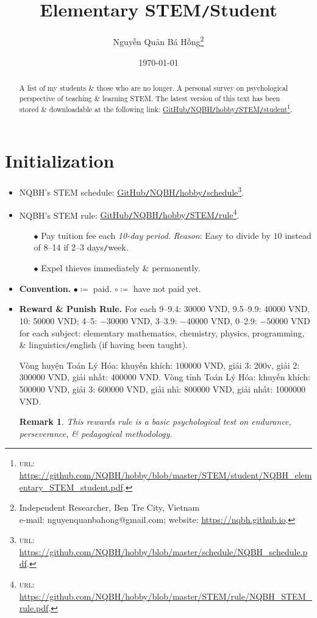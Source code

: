 \documentclass{article}
\title{Elementary STEM\texttt{/}Student}
\author{Nguyễn Quản Bá Hồng\footnote{Independent Researcher, Ben Tre City, Vietnam\\e-mail: \textsf{nguyenquanbahong@gmail.com}; website: \url{https://nqbh.github.io}.}}
\date{\today}
\newtheorem{remark}{Remark}
\begin{document}
\maketitle
\begin{abstract}
	A list of my students \& those who are no longer. A personal survey on psychological perspective of teaching \& learning STEM. The latest version of this text has been stored \& downloadable at the following link: \href{https://github.com/NQBH/hobby/blob/master/STEM/student/NQBH_elementary_STEM_student.pdf}{GitHub\texttt{/}NQBH\texttt{/}hobby\texttt{/}STEM\texttt{/}student}\footnote{\textsc{url}: \url{https://github.com/NQBH/hobby/blob/master/STEM/student/NQBH_elementary_STEM_student.pdf}.}.
\end{abstract}
\tableofcontents
\newpage


\section*{Initialization}

\begin{itemize}
	\item NQBH's STEM schedule: \href{https://github.com/NQBH/hobby/blob/master/schedule/NQBH_schedule.pdf}{GitHub\texttt{/}NQBH\texttt{/}hobby\texttt{/}schedule}\footnote{\textsc{url}: \url{https://github.com/NQBH/hobby/blob/master/schedule/NQBH_schedule.pdf}.}.
	\item NQBH's STEM rule: \href{https://github.com/NQBH/hobby/blob/master/STEM/rule/NQBH_STEM_rule.pdf}{GitHub\texttt{/}NQBH\texttt{/}hobby\texttt{/}STEM\texttt{/}rule}\footnote{\textsc{url}: \url{https://github.com/NQBH/hobby/blob/master/STEM/rule/NQBH_STEM_rule.pdf}.}.
	\begin{itemize}
		\item[$\bullet$] Pay tuition fee each \textit{10-day period}. \textit{Reason}: Easy to divide by $10$ instead of 8--14 if 2--3 days\texttt{/}week.
		\item[$\bullet$] Expel thieves immediately \& permanently.
	\end{itemize}
	\item \textbf{Convention.} $\bullet\coloneq$ paid. $\circ\coloneq$ have not paid yet.
	\item \textbf{Reward \& Punish Rule.} For each 9--9.4: 30000 VND, 9.5--9.9: 40000 VND, 10: 50000 VND; 4--5: $-30000$ VND, 3--3.9: $-40000$ VND, 0--2.9: $-50000$ VND for each subject: elementary mathematics, chemistry, physics, programming, \& linguistics\texttt{/}english (if having been taught).
	
	Vòng huyện Toán Lý Hóa: khuyến khích: 100000 VND, giải 3: 200v, giải 2: 300000 VND, giải nhất: 400000 VND. Vòng tỉnh Toán Lý Hóa: khuyến khích: 500000 VND, giải 3: 600000 VND, giải nhì: 800000 VND, giải nhất: 1000000 VND.	
	\begin{remark}
		This rewards rule is a basic psychological test on endurance, perseverance, \& pedagogical methodology.
	\end{remark}
\end{itemize}
\end{document}
